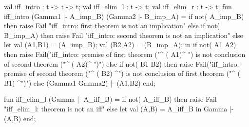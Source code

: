 \nwenddocs{}\plusendmoddef\nwstartdeflinemarkup{}\nwenddeflinemarkup
val iff_intro : t -> t -> t;
val iff_elim_l : t -> t;
val iff_elim_r : t -> t;
\nwendcode{}\nwdocspar
\nwenddocs{}\plusendmoddef\nwstartdeflinemarkup{}\nwenddeflinemarkup
fun iff_intro (Gamma1 |- A_imp_B) (Gamma2 |- B_imp_A) =
  if not( A_imp_B)
  then raise Fail "iff_intro: first theorem is not an implication"
  else if not( B_imp_A)
  then raise Fail "iff_intro: second theorem is not an implication"
  else let
    val (A1,B1) = (A_imp_B);
    val (B2,A2) = (B_imp_A);
  in
    if not( A1 A2)
    then raise Fail("iff_intro: premise of first theorem ("^
                    ( A1)^
                    ") is not conclusion of second theorem ("^
                    ( A2)^
                    ")")
    else if not( B1 B2)
    then raise Fail("iff_intro: premise of second theorem ("^
                    ( B2)
                    ^") is not conclusion of first theorem ("^
                    ( B1)
                    ^")")
    else (Gamma1  Gamma2) |- (A1,B2)
  end;

fun iff_elim_l (Gamma |- A_iff_B) =
  if not( A_iff_B)
  then raise Fail "iff_elim_l: theorem is not an iff"
  else
    let val (A,B) =  A_iff_B
    in Gamma |- (A,B) end;

